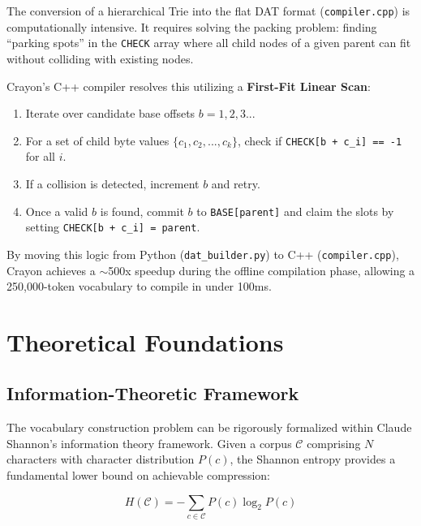 \documentclass[11pt,a4paper,twocolumn]{article}
\begin{document}
The conversion of a hierarchical Trie into the flat DAT format (\texttt{compiler.cpp}) is computationally intensive. It requires solving the packing problem: finding ``parking spots'' in the \texttt{CHECK} array where all child nodes of a given parent can fit without colliding with existing nodes.

Crayon's C++ compiler resolves this utilizing a \textbf{First-Fit Linear Scan}:
\begin{enumerate}
    \item Iterate over candidate base offsets $b = 1, 2, 3...$
    \item For a set of child byte values $\{c_1, c_2, ..., c_k\}$, check if \texttt{CHECK[b + c\_i] == -1} for all $i$.
    \item If a collision is detected, increment $b$ and retry.
    \item Once a valid $b$ is found, commit $b$ to \texttt{BASE[parent]} and claim the slots by setting \texttt{CHECK[b + c\_i] = parent}.
\end{enumerate}

By moving this logic from Python (\texttt{dat\_builder.py}) to C++ (\texttt{compiler.cpp}), Crayon achieves a $\sim$500x speedup during the offline compilation phase, allowing a 250,000-token vocabulary to compile in under 100ms.

\section{Theoretical Foundations}
\label{sec:theory}

\subsection{Information-Theoretic Framework}

The vocabulary construction problem can be rigorously formalized within Claude Shannon's information theory framework. Given a corpus $\mathcal{C}$ comprising $N$ characters with character distribution $P(c)$, the Shannon entropy provides a fundamental lower bound on achievable compression:

\begin{equation}
H(\mathcal{C}) = -\sum_{c \in \mathcal{C}} P(c) \log_2 P(c)
\label{eq:shannon_entropy}
\end{equation}
\end{document}
